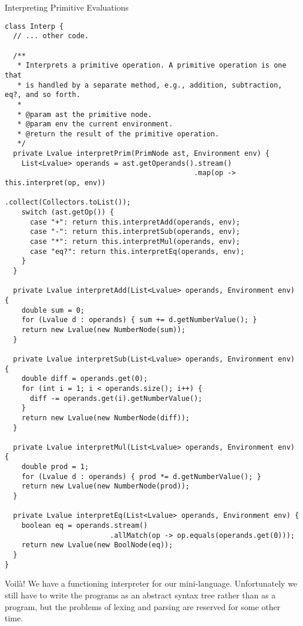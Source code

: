 \begin{cl}{Interpreting Primitive Evaluations}
\begin{lstlisting}[language=MyJava]
class Interp {
  // ... other code.

  /**
   * Interprets a primitive operation. A primitive operation is one that
   * is handled by a separate method, e.g., addition, subtraction, eq?, and so forth.
   * 
   * @param ast the primitive node.
   * @param env the current environment.
   * @return the result of the primitive operation.
   */
  private Lvalue interpretPrim(PrimNode ast, Environment env) {
    List<Lvalue> operands = ast.getOperands().stream()
                                             .map(op -> this.interpret(op, env))
                                             .collect(Collectors.toList());
    switch (ast.getOp()) {
      case "+": return this.interpretAdd(operands, env);
      case "-": return this.interpretSub(operands, env);
      case "*": return this.interpretMul(operands, env);
      case "eq?": return this.interpretEq(operands, env);
    }
  }

  private Lvalue interpretAdd(List<Lvalue> operands, Environment env) {
    double sum = 0;
    for (Lvalue d : operands) { sum += d.getNumberValue(); }
    return new Lvalue(new NumberNode(sum));
  }

  private Lvalue interpretSub(List<Lvalue> operands, Environment env) {
    double diff = operands.get(0);
    for (int i = 1; i < operands.size(); i++) { 
      diff -= operands.get(i).getNumberValue(); 
    }
    return new Lvalue(new NumberNode(diff));
  }

  private Lvalue interpretMul(List<Lvalue> operands, Environment env) {
    double prod = 1;
    for (Lvalue d : operands) { prod *= d.getNumberValue(); }
    return new Lvalue(new NumberNode(prod));
  }

  private Lvalue interpretEq(List<Lvalue> operands, Environment env) {
    boolean eq = operands.stream()
                         .allMatch(op -> op.equals(operands.get(0)));
    return new Lvalue(new BoolNode(eq));
  }
}
\end{lstlisting}
\end{cl}
Voil\`a! We have a functioning interpreter for our mini-language. Unfortunately we still have to write the programs as an abstract syntax tree rather than as a program, but the problems of lexing and parsing are reserved for some other time.